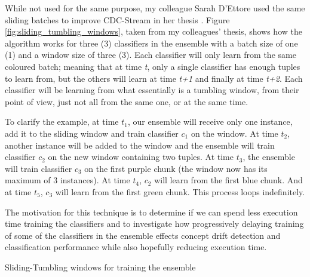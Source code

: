 While not used for the same purpose, my colleague Sarah D'Ettore used the same sliding batches to improve CDC-Stream in her thesis \citep{d2016fine}. Figure \ref{fig:sliding_tumbling_windows}, taken from my colleagues' thesis, shows how the algorithm works for three (3) classifiers in the ensemble with a batch size of one (1) and a window size of three (3). Each classifier will only learn from the same coloured batch; meaning that at time \textit{t}, only a single classifier has enough tuples to learn from, but the others will learn at time \textit{t+1} and finally at time \textit{t+2}. Each classifier will be learning from what essentially is a tumbling window, from their point of view, just not all from the same one, or at the same time. 

To clarify the example, at time $t_1$, our ensemble will receive only one instance, add it to the sliding window and train classifier $c_1$ on the window. At time $t_2$, another instance will be added to the window and the ensemble will train classifier $c_2$ on the new window containing two tuples. At time $t_3$, the ensemble will train classifier $c_3$ on the first purple chunk (the window now has its maximum of 3 instances). At time $t_4$, $c_2$ will learn from the first blue chunk. And at time $t_5$, $c_3$ will learn from the first green chunk. This process loops indefinitely. 

The motivation for this technique is to determine if we can spend less execution time training the classifiers and to investigate how progressively delaying training of some of the classifiers in the ensemble effects concept drift detection and classification performance while also hopefully reducing execution time.

\begin{algorithm}
\caption{Sliding-Tumbling windows for training the ensemble\label{alg:sliding_tumbling_windows}}
\end{algorithm}


